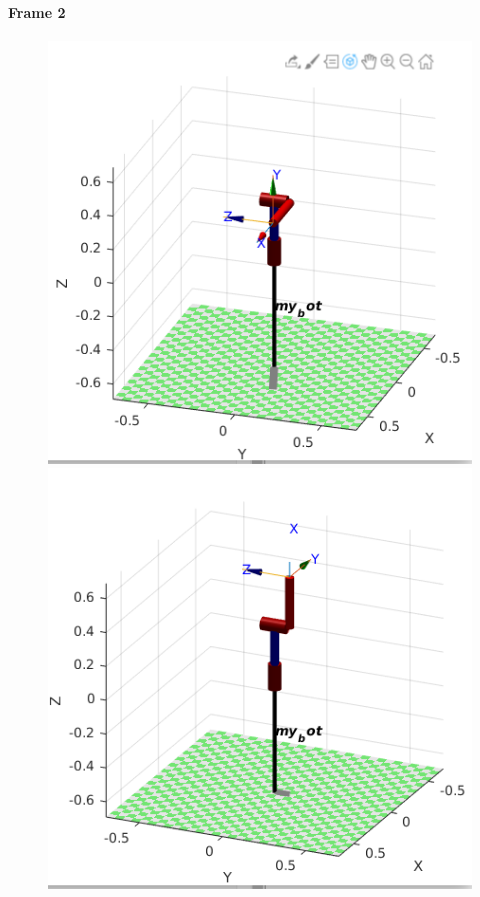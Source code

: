 \documentclass{article}
\begin{document}
\paragraph{Frame 2}
\begin{center}
\begin{figure}[!htb]
   \begin{minipage}{0.33\textwidth}
     \centering
     \includegraphics[width=\linewidth]{images/frame2.png}
   \end{minipage}\hfill
   \begin{minipage}{0.33\textwidth}
     \centering
     \includegraphics[width=\linewidth]{images/frame2_q2_90.png}

\end{minipage}
\end{figure}
\end{center}
\end{document}
